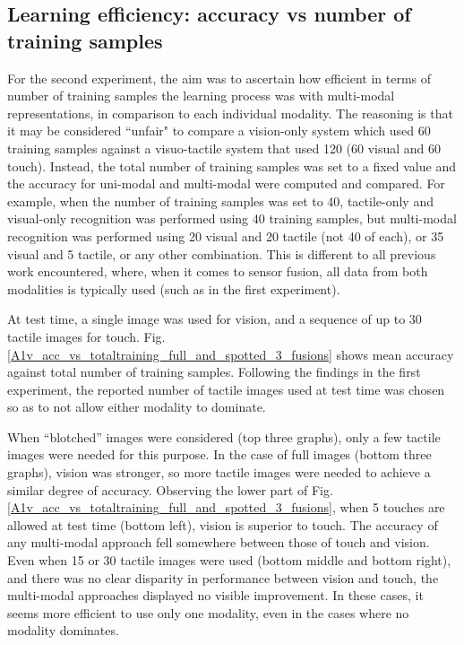 \documentclass[9pt,technote]{IEEEtran}  %
\begin{document}
\subsection{Learning efficiency: accuracy vs number of training samples}

For the second experiment, the aim was to ascertain how efficient in terms of number of training samples the learning process was with multi-modal representations, in comparison to each individual modality. The reasoning is that it may be considered ``unfair" to compare a vision-only system which used 60 training samples against a visuo-tactile system that used 120 (60 visual and 60 touch). Instead, the total number of training samples was set to a fixed value and the accuracy for uni-modal and multi-modal were computed and compared. For example, when the number of training samples was set to 40, tactile-only and visual-only recognition was performed using 40 training samples, but multi-modal recognition was performed using 20 visual and 20 tactile (not 40 of each), or 35 visual and 5 tactile, or any other combination. This is different to all previous work encountered, where, when it comes to sensor fusion, all data from both modalities is typically used (such as in the first experiment). 

At test time, a single image was used for vision, and a sequence of up to 30 tactile images for touch. Fig. \ref{A1v_acc_vs_totaltraining_full_and_spotted_3_fusions} shows mean accuracy against total number of training samples. Following the findings in the first experiment, the reported number of tactile images used at test time was chosen so as to not allow either modality to dominate. 

When ``blotched'' images were considered (top three graphs), only a few tactile images were needed for this purpose. In the case of full images (bottom three graphs), vision was stronger, so more tactile images were needed to achieve a similar degree of accuracy. Observing the lower part of Fig. \ref{A1v_acc_vs_totaltraining_full_and_spotted_3_fusions}, when 5 touches are allowed at test time (bottom left), vision is superior to touch. The accuracy of any multi-modal approach fell somewhere between those of touch and vision. Even when 15 or 30 tactile images were used (bottom middle and bottom right), and there was no clear disparity in performance between vision and touch, the multi-modal approaches displayed no visible improvement. In these cases, it seems more efficient to use only one modality, even in the cases where no modality dominates. 
\end{document}
